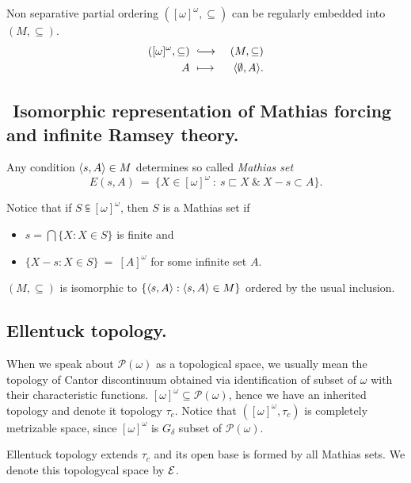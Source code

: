\begin{proposition}
 Non separative partial ordering $([\omega]^\omega, \subseteq)$ can be
 regularly embedded into $(M,\subseteq)$.
\begin{eqnarray*}
 ([\omega]^\omega, \subseteq) \ & \hooklongrightarrow & \ (M,\subseteq) \\
 			A     \ & \longmapsto	  & \ \< \emptyset, A\>.
\end{eqnarray*}
\end{proposition}

\subsection{${}$ \hspace{-1em}Isomorphic representation of Mathias forcing
and infinite Ramsey theory.} Any condition $\langle s,A \rangle \in M$ determines
so called \emph{Mathias set}
$$
E(s,A) \ = \ \{ X \in [\omega]^\omega \ : \ s \sqsubset X \ \& \ X-s \subset A \}.
$$

Notice that if  $S \subseteqq [\omega]^\omega$, then $S$ is a Mathias set
if \begin{itemize}
    \item[] $s = \bigcap \{X : X \in S \}$ is finite and
    \item[] $\{ X - s : X \in S \} \ = \ [A]^\omega$ for some
	infinite set $A$.
   \end{itemize}

\begin{fact}
 $(M,\subseteq)$ is isomorphic to $\{\langle s,A\rangle : \langle s,A\rangle \in M \}$ ordered
by the usual inclusion.
\end{fact}

\subsection{${}$Ellentuck topology.}

When we speak about $\mathcal P(\omega)$ as a topological space,
we usually mean the topology of Cantor discontinuum obtained
via identification of subset of $\omega$ with their characteristic
functions. $[\omega]^\omega \subseteq \mathcal P(\omega)$,
hence we have an inherited topology and denote it topology $\tau_c$.
Notice that $([\omega]^\omega, \tau_c )$ is completely metrizable
space, since $[\omega]^\omega$ is $G_\delta$ subset of $\mathcal P(\omega)$.


Ellentuck topology extends $\tau_c$ and its open  base is formed
by all Mathias sets. We denote this topologycal space by $\mathcal E$.

